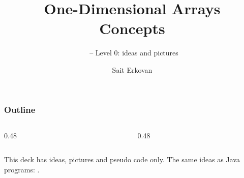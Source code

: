 \documentclass[aspectratio=169,10pt,compress]{beamer}
\title[Arrays 1D: Concepts]{
	One-Dimensional Arrays\\
	Concepts
}
\subtitle{
	\cisOOO\ -- Level 0: ideas and pictures
}
\author[Erkovan]{Sait Erkovan}
\institute[FCIS]{
	Faculty of Computer and Information Sciences\\
	Yeditepe University
}
\date{{\tiny \hbTimeStamp}}
\begin{document}
\begin{frame}[t,fragile]
	\titlepage
\end{frame}




\begin{frame}[t,fragile] \frametitle{Outline}
	\begin{columns}[T]
		\begin{column}{0.48\textwidth}
			\tableofcontents[sections={1-4}, hideallsubsections]
		\end{column}
		\begin{column}{0.48\textwidth}
			\tableofcontents[sections={5-8}, hideallsubsections]
		\end{column}
	\end{columns}

	\vspace{1em}
	\small This deck has ideas, pictures and pseudo code only.
	The same ideas as Java programs: .
\end{frame}




\end{document}
